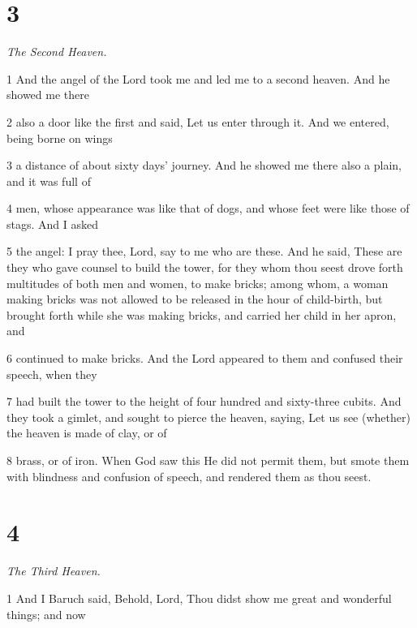 \chapter{3}

\par \textit{The Second Heaven.}

\par 1 And the angel of the Lord took me and led me to a second heaven. And he showed me there

\par 2 also a door like the first and said, Let us enter through it. And we entered, being borne on wings

\par 3 a distance of about sixty days' journey. And he showed me there also a plain, and it was full of

\par 4 men, whose appearance was like that of dogs, and whose feet were like those of stags. And I asked

\par 5 the angel: I pray thee, Lord, say to me who are these. And he said, These are they who gave counsel to build the tower, for they whom thou seest drove forth multitudes of both men and women, to make bricks; among whom, a woman making bricks was not allowed to be released in the hour of child-birth, but brought forth while she was making bricks, and carried her child in her apron, and

\par 6 continued to make bricks. And the Lord appeared to them and confused their speech, when they

\par 7 had built the tower to the height of four hundred and sixty-three cubits. And they took a gimlet, and sought to pierce the heaven, saying, Let us see (whether) the heaven is made of clay, or of

\par 8 brass, or of iron. When God saw this He did not permit them, but smote them with blindness and confusion of speech, and rendered them as thou seest.

\chapter{4}

\par \textit{The Third Heaven.}

\par 1 And I Baruch said, Behold, Lord, Thou didst show me great and wonderful things; and now

